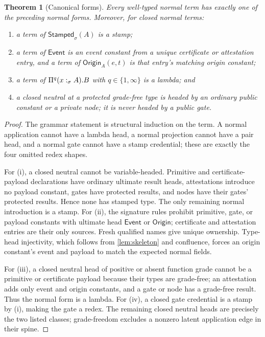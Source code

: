 \documentclass[11pt]{article}
\numberwithin{equation}{section}
\theoremstyle{definition}
\theoremstyle{plain}
\newtheorem{theorem}[definition]{Theorem}
\theoremstyle{remark}
\newcommand{\Event}{\mathsf{Event}}
\newcommand{\Origin}{\mathsf{Origin}}
\newcommand{\Stamped}{\mathsf{Stamped}}
\newcommand{\absent}{\boldsymbol\infty}
\begin{document}
\begin{theorem}[Canonical forms]\label{thm:canonical-forms}
Every well-typed normal term has exactly one of the preceding normal forms.
Moreover, for closed normal terms:
\begin{enumerate}[label=(\roman*),leftmargin=2.5em]
\item a term of \(\Stamped_\sigma(A)\) is a stamp;
\item a term of \(\Event\) is an event constant from a unique certificate or
attestation entry, and a term of \(\Origin_A(e,t)\) is that entry's matching
origin constant;
\item a term of \(\Pi^q(x:_{\sigma}A).B\) with
\(q\in\{1,\absent\}\) is a lambda; and
\item a closed neutral at a protected grade-free type is headed by an
ordinary public constant or a private node; it is never headed by a public
gate.
\end{enumerate}
\end{theorem}

\begin{proof}
The grammar statement is structural induction on the term.  A normal
application cannot have a lambda head, a normal projection cannot have a pair
head, and a normal gate cannot have a stamp credential; these are exactly the
four omitted redex shapes.

For (i), a closed neutral cannot be variable-headed.  Primitive and
certificate-payload declarations have ordinary ultimate result heads,
attestations introduce no payload constant, gates have protected results, and
nodes have their gates' protected results.  Hence none has stamped type.  The
only remaining normal introduction is a stamp.
For (ii), the signature rules prohibit primitive, gate, or payload constants
with ultimate head \(\Event\) or \(\Origin\); certificate and attestation
entries are their only sources.  Fresh qualified names give unique ownership.  Type-head
injectivity, which follows from \cref{lem:skeleton} and confluence, forces an
origin constant's event and payload to match the expected normal fields.

For (iii), a closed neutral head of positive or absent function grade cannot
be a primitive or certificate payload because their types are grade-free;
an attestation adds only event and origin constants, and a gate or node has a
grade-free result.  Thus the normal form is a lambda.  For (iv), a closed gate credential is a stamp by (i), making the
gate a redex.  The remaining closed neutral heads are precisely the two
listed classes; grade-freedom excludes a nonzero latent application edge in
their spine.
\end{proof}
\end{document}
